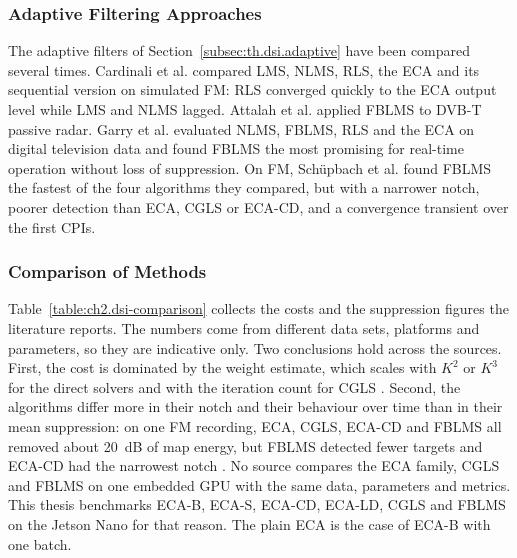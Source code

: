 \subsubsection{Adaptive Filtering Approaches}
\label{subsubsec:ch2.chain.dsi.adaptive}
\todo{}
The adaptive filters of Section~\ref{subsec:th.dsi.adaptive} have been compared several times. Cardinali et al. \citep{cardinali2007} compared LMS, NLMS, RLS, the ECA and its sequential version on simulated FM: RLS converged quickly to the ECA output level while LMS and NLMS lagged. Attalah et al. \citep{attalah2017} applied FBLMS to DVB-T passive radar. Garry et al. \citep{garry2017} evaluated NLMS, FBLMS, RLS and the ECA on digital television data and found FBLMS the most promising for real-time operation without loss of suppression. On FM, Schüpbach et al. \citep{schuepbach2020} found FBLMS the fastest of the four algorithms they compared, but with a narrower notch, poorer detection than ECA, CGLS or ECA-CD, and a convergence transient over the first CPIs.

\subsubsection{Comparison of Methods}
\label{subsubsec:ch2.chain.dsi.comparison}


Table~\ref{table:ch2.dsi-comparison} collects the costs and the suppression figures the literature reports. The numbers come from different data sets, platforms and parameters, so they are indicative only. Two conclusions hold across the sources. First, the cost is dominated by the weight estimate, which scales with $K^2$ or $K^3$ for the direct solvers and with the iteration count for CGLS \citep{colone2016,lu2026,schuepbach2020}. Second, the algorithms differ more in their notch and their behaviour over time than in their mean suppression: on one FM recording, ECA, CGLS, ECA-CD and FBLMS all removed about 20~dB of map energy, but FBLMS detected fewer targets and ECA-CD had the narrowest notch \citep{schuepbach2020}. No source compares the ECA family, CGLS and FBLMS on one embedded GPU with the same data, parameters and metrics. This thesis benchmarks ECA-B, ECA-S, ECA-CD, ECA-LD, CGLS and FBLMS on the Jetson Nano for that reason. The plain ECA is the case of ECA-B with one batch.


